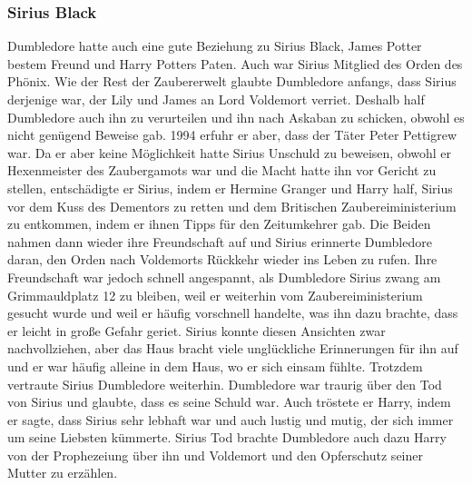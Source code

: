 \documentclass[a4paper, 10pt]{article}
\begin{document}
\subsubsection*{\large Sirius Black}
Dumbledore hatte auch eine gute Beziehung zu Sirius Black, James Potter bestem Freund und Harry Potters Paten. Auch war Sirius Mitglied des Orden des Phönix. Wie der Rest der Zaubererwelt glaubte Dumbledore anfangs, dass Sirius derjenige war, der Lily und James an Lord Voldemort verriet. Deshalb half Dumbledore auch ihn zu verurteilen und ihn nach Askaban zu schicken, obwohl es nicht genügend Beweise gab. 1994 erfuhr er aber, dass der Täter Peter Pettigrew war. Da er aber keine Möglichkeit hatte Sirius Unschuld zu beweisen, obwohl er Hexenmeister des Zaubergamots war und die Macht hatte ihn vor Gericht zu stellen, entschädigte er Sirius, indem er Hermine Granger und Harry half, Sirius vor dem Kuss des Dementors zu retten und dem Britischen Zaubereiministerium zu entkommen, indem er ihnen Tipps für den Zeitumkehrer gab.
\vspace{10pt}
\newline
{}  
Die Beiden nahmen dann wieder ihre Freundschaft auf und Sirius erinnerte Dumbledore daran, den Orden nach Voldemorts Rückkehr wieder ins Leben zu rufen. Ihre Freundschaft war jedoch schnell angespannt, als Dumbledore Sirius zwang am Grimmauldplatz 12 zu bleiben, weil er weiterhin vom Zaubereiministerium gesucht wurde und weil er häufig vorschnell handelte, was ihn dazu brachte, dass er leicht in große Gefahr geriet. Sirius konnte diesen Ansichten zwar nachvollziehen, aber das Haus bracht viele unglückliche Erinnerungen für ihn auf und er war häufig alleine in dem Haus, wo er sich einsam fühlte. Trotzdem vertraute Sirius Dumbledore weiterhin. Dumbledore war traurig über den Tod von Sirius und glaubte, dass es seine Schuld war. Auch tröstete er Harry, indem er sagte, dass Sirius sehr lebhaft war und auch lustig und mutig, der sich immer um seine Liebsten kümmerte. Sirius Tod brachte Dumbledore auch dazu Harry von der Prophezeiung über ihn und Voldemort und den Opferschutz seiner Mutter zu erzählen.
\end{document}
